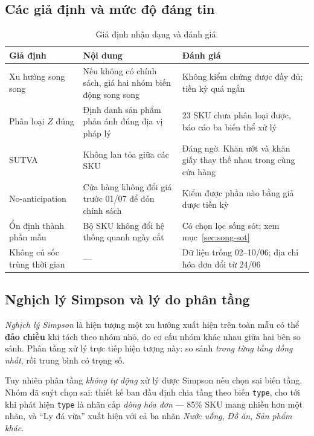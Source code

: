\documentclass[11pt]{article}
\begin{document}
\subsection{Các giả định và mức độ đáng tin}

\begin{table}[htbp]
  \centering
  \caption{Giả định nhận dạng và đánh giá.}
  \label{tab:gia-dinh}
  \begin{tabular}{p{3.4cm}p{5.0cm}p{5.6cm}}
    \toprule
    Giả định & Nội dung & Đánh giá \\
    \midrule
    Xu hướng song song & Nếu không có chính sách, giá hai nhóm biến động song song
    & Không kiểm chứng được đầy đủ; tiền kỳ quá ngắn \\
    \addlinespace
    Phân loại $Z$ đúng & Định danh sản phẩm phản ánh đúng địa vị pháp lý
    & 23 SKU chưa phân loại được, báo cáo ba biến thể xử lý \\
    \addlinespace
    SUTVA & Không lan tỏa giữa các SKU
    & Đáng ngờ. Khăn ướt và khăn giấy thay thế nhau trong cùng cửa hàng \\
    \addlinespace
    No-anticipation & Cửa hàng không đổi giá trước 01/07 để đón chính sách
    & Kiểm được phần nào bằng giả dược tiền kỳ \\
    \addlinespace
    Ổn định thành phần mẫu & Bộ SKU không đổi hệ thống quanh ngày cắt
    & Có chọn lọc sống sót; xem mục~\ref{sec:song-sot} \\
    \addlinespace
    Không cú sốc trùng thời gian & ---
    & Dữ liệu trống 02--10/06; địa chỉ hóa đơn đổi từ 24/06 \\
    \bottomrule
  \end{tabular}
\end{table}

\subsection{Nghịch lý Simpson và lý do phân tầng}

\emph{Nghịch lý Simpson} là hiện tượng một xu hướng xuất hiện trên toàn mẫu có thể \textbf{đảo
chiều} khi tách theo nhóm nhỏ, do cơ cấu nhóm khác nhau giữa hai bên so sánh. Phân tầng xử lý trực
tiếp hiện tượng này: so sánh \emph{trong từng tầng đồng nhất}, rồi trung bình có trọng số.

Tuy nhiên phân tầng \emph{không tự động} xử lý được Simpson nếu chọn sai biến tầng. Nhóm đã suýt
chọn sai: thiết kế ban đầu định chia tầng theo biến \texttt{type}, cho tới khi phát hiện
\texttt{type} là nhãn cấp \emph{dòng hóa đơn} --- 85\% SKU mang nhiều hơn một nhãn, và ``Ly đá
vừa'' xuất hiện với cả ba nhãn \emph{Nước uống}, \emph{Đồ ăn}, \emph{Sản phẩm khác}.
\end{document}
